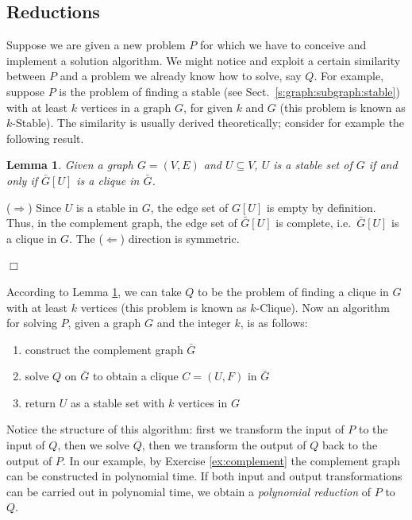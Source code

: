 \documentclass[a4paper]{book}
\theoremstyle{changebreak}                %
\newtheorem{lem}[result]{Lemma}
\newenvironment{proof}
 {{\sl Proof.}\hspace*{1 ex}}%
 {{\nopagebreak\hspace*{\fill}$\Box$\par\vspace{12pt}}}
\begin{document}
\subsection{Reductions}
\label{s:problem:reduction}
Suppose we are given a new problem $P$ for which we have to conceive
and implement a solution algorithm. We might notice
and exploit a certain similarity between $P$ and a problem we already
know how to solve, say $Q$. For example, suppose $P$ is the problem of
finding a stable (see
Sect.~\ref{s:graph:subgraph:stable}) with at least $k$ vertices in a
graph $G$, for given $k$ and $G$ (this problem is known as {\sc
  $k$-Stable}). The similarity is
usually derived theoretically; consider for example the following
result.
\begin{lem}
Given a graph $G=(V,E)$ and $U\subseteq V$, $U$ is a stable
set of $G$ if and only if $\bar{G}[U]$ is a
clique in $\bar{G}$.
\label{lem:cliqstab}
\end{lem}
\begin{proof}
($\Rightarrow$) Since $U$ is a stable in $G$, the edge
  set of $G[U]$ is empty by definition. Thus, in the
  complement graph, the edge set of
  $\bar{G}[U]$ is complete, i.e.~$\bar{G}[U]$ is a
  clique in $G$. The ($\Leftarrow$) direction is symmetric.
\end{proof}

According to Lemma \ref{lem:cliqstab}, we can take $Q$ to be the
problem of finding a clique in $G$ with at least $k$
vertices (this problem is known as {\sc
  $k$-Clique}). Now an algorithm
for solving $P$, given a graph $G$ and the integer $k$,
is as follows:
\begin{enumerate}
\item construct the complement graph $\bar{G}$
\item solve $Q$ on $\bar{G}$ to obtain a clique
  $C=(U,F)$ in $\bar{G}$ 
\item return $U$ as a stable set with $k$
  vertices in $G$ 
\end{enumerate}
Notice the structure of this algorithm: first we transform the
input of $P$ to the input of $Q$, then we solve $Q$, then
we transform the output of $Q$ back to the output of
$P$. In our example, by Exercise \ref{ex:complement} the complement
graph can be constructed in polynomial time. If
both input and output transformations can be carried out in polynomial
time, we obtain a {\it polynomial
  reduction} of $P$ to $Q$.
\end{document}
